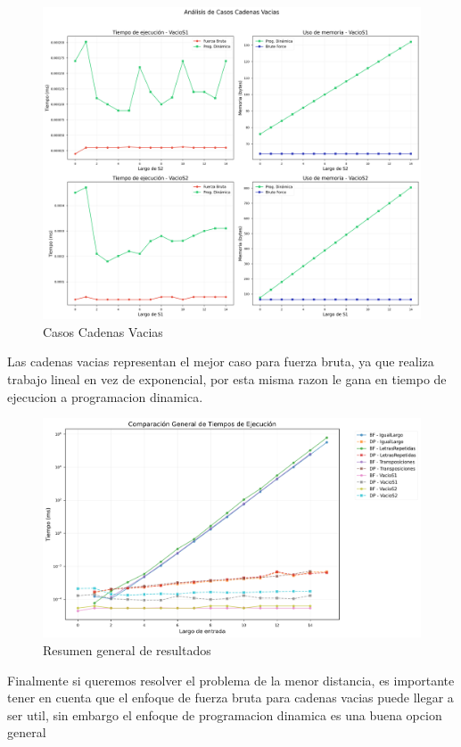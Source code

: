 \begin{figure}[H]
    \centering
        \includegraphics[width=\textwidth]{images/casos_especiales.png} 
        \caption{Casos Cadenas Vacias}
    \label{fig:scatterplot_5}
\end{figure}
Las cadenas vacias representan el mejor caso para fuerza bruta, ya que realiza trabajo lineal en vez de exponencial, por esta misma razon le gana en tiempo de ejecucion
a programacion dinamica.
\begin{figure}[H]
    \centering
        \includegraphics[width=\textwidth]{images/comparacion_general_tiempos.png}    
    \caption{Resumen general de resultados}
    \label{fig:scatterplot_6}
\end{figure}
Finalmente si queremos resolver el problema de la menor distancia, es importante tener en cuenta que el enfoque de fuerza bruta para cadenas vacias 
puede llegar a ser util, sin embargo el enfoque de programacion dinamica es una buena opcion general
